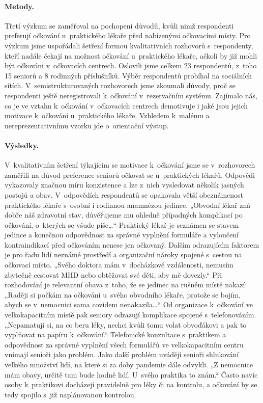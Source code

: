 \paragraph*{Metody.}
Třetí výzkum se zaměřoval na pochopení důvodů, kvůli nimž respondenti preferují očkování u~praktického lékaře před nabízenými očkovacími místy. Pro výzkum jsme uspořádali šetření formou kvalitativních rozhovorů s~respondenty, kteří nadále čekají na možnost očkování u~praktického lékaře, ačkoli by již mohli být očkováni v~očkovacích centrech. Oslovili jsme celkem 23 respondentů, z~toho 15 seniorů a 8 rodinných příslušníků. Výběr respondentů probíhal na sociálních sítích. V~semistrukturovaných rozhovorech jsme zkoumali důvody, proč se respondenti ještě neregistrovali k~očkování v~rezervačním systému. Zajímalo nás, co je ve vztahu k~očkování v~očkovacích centrech demotivuje i jaké jsou jejich motivace k~očkování u~praktického lékaře. Vzhledem k~malému a nereprezentativnímu vzorku jde o~orientační výstup. 
 
\paragraph*{Výsledky.}
V~kvalitativním šetření týkajícím se motivace k~očkování jsme se v~rozhovorech zaměřili na důvod preference seniorů očkovat se u~praktických lékařů. Odpovědi vykazovaly značnou míru konzistence a lze z~nich vysledovat několik jasných postojů a obav.
V~odpovědích respondentů se opakovala větší obeznámenost praktického lékaře s~osobní i rodinnou anamnézou jedince. „Obvodní lékař zná dobře náš zdravotní stav, důvěřujeme mu ohledně případných komplikací po očkování, o~kterých se všude píše…“ Praktický lékař je seznámen se stavem jedince a konečnou odpovědnost za správné vyplnění formuláře a vyloučení kontraindikací před očko\-vá\-ním nenese jen očkovaný. 
Dalším odrazujícím faktorem je pro řadu lidí neznámé prostředí a organizační nároky spojené s~cestou na očkovací místo. „Svého doktora mám v~docházkové vzdálenosti, nemusím zbytečně cestovat MHD nebo obtěžovat své děti, aby mě dovezly.“ Při rozhodování je relevantní obava z~toho, že se jedinec na rušném místě nakazí: „Raději si počkám na očkování u~svého obvodního lékaře, protože se bojím, abych se v~nemocnici sama covidem nenakazila…“
Od organizace k~očko\-vá\-ní ve velkokapacitním místě pak seniory odrazují komplikace spojené s~telefonováním. „Nepamatuji si, na co beru léky, nechci kvůli tomu volat obvoďákovi a pak to vyplňovat na papíru k~očkování.“ Telefonické konzultace s~praktikem a odpovědnost za správné vyplnění všech formulářů ve velkokapacitním centru vnímají senioři jako problém. Jako další problém uvádějí senioři shlukování velkého množství lidí, na které si za doby pandemie dále odvykli. „Z nemocnice mám obavy, určitě tam bude hodně lidí. U~svého praktika to znám.“ Často navíc osoby k~praktikovi docházejí pravidelně pro léky či na kontrolu, a očkování by se tedy spojilo s~již naplánovanou kontrolou.

